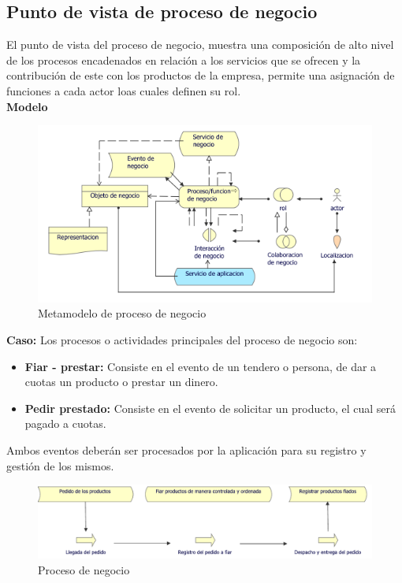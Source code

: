 	\subsection{Punto de vista de proceso de negocio}
	{ El punto de vista del proceso de negocio, muestra una composición de alto nivel de los procesos encadenados en relación a los servicios que se ofrecen y la contribución de este con los productos de la empresa, permite una asignación de funciones a cada actor loas cuales definen su rol.\\
		
		\textbf{Modelo}\\
		\begin{figure}[H]
			\centering
			\includegraphics[width=0.8\linewidth]{development/proceso.png}
			\caption{Metamodelo de proceso de negocio}
		\end{figure}
		
		\textbf{Caso:} Los procesos o actividades principales del proceso de negocio son:
		
		\begin{itemize}
			\item \textbf{Fiar - prestar:} Consiste en el evento de un tendero o persona, de dar a cuotas un producto o prestar un dinero.
			
			\item \textbf{Pedir prestado:} Consiste en el evento de solicitar un producto, el cual será pagado a cuotas.
			
		\end{itemize}
		
		Ambos eventos deberán ser procesados por la aplicación para su registro y gestión de los mismos.
		
		
		\begin{figure}[H]
			\centering
			\includegraphics[width=0.8\linewidth]{development/proceso.pdf}
			\caption{Proceso de negocio}
		\end{figure}
	}
	
